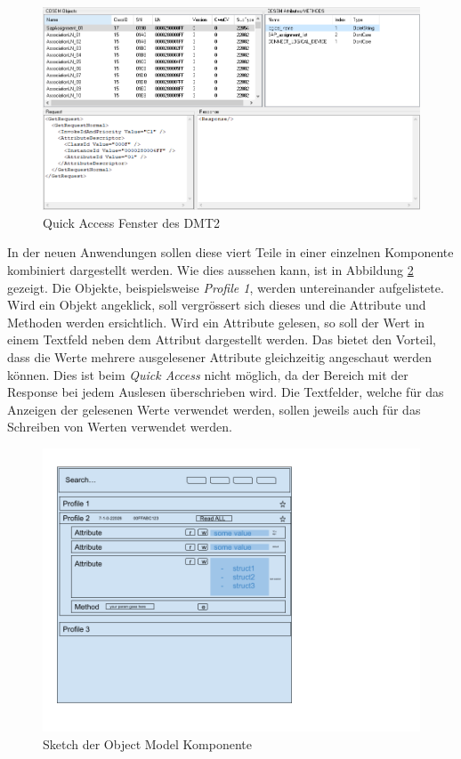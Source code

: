\begin{figure}
   \centering
   \includegraphics[width=1.0\textwidth]{gfx/UI_DMT2.png}
   \caption{
      Quick Access Fenster des \ac{DMT2}
      }
      \label{fig:dmt2QuickAccess}
\end{figure}
In der neuen Anwendungen sollen diese viert Teile in einer einzelnen Komponente kombiniert dargestellt werden.
Wie dies aussehen kann, ist in Abbildung \ref{fig:objectModelUIsktech} gezeigt.
Die Objekte, beispielsweise \textit{Profile 1}, werden untereinander aufgelistete.
Wird ein Objekt angeklick, soll vergrössert sich dieses und die Attribute und Methoden werden ersichtlich.
Wird ein Attribute gelesen, so soll der Wert in einem Textfeld neben dem Attribut dargestellt werden.
Das bietet den Vorteil, dass die Werte mehrere ausgelesener Attribute gleichzeitig angeschaut werden können. 
Dies ist beim \textit{Quick Access} nicht möglich, da der Bereich mit der Response bei jedem Auslesen überschrieben wird.
Die Textfelder, welche für das Anzeigen der gelesenen Werte verwendet werden, sollen jeweils auch für das Schreiben von Werten verwendet werden.

\begin{figure}
   \centering
   \includegraphics[width=1.0\textwidth]{gfx/Object Explorer Sketch.png}
   \caption{
      Sketch der Object Model Komponente
      }
      \label{fig:objectModelUIsktech}
\end{figure}


